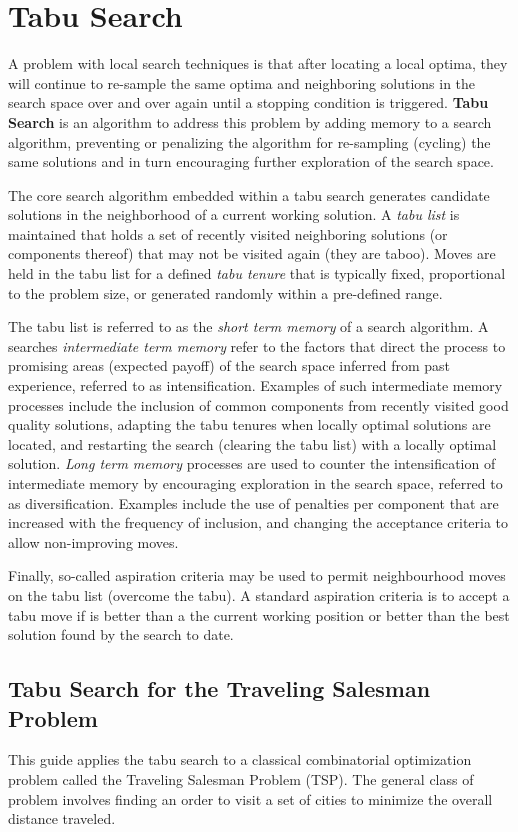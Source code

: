 \section{Tabu Search}
A problem with local search techniques is that after locating a local optima, they will continue to re-sample the same optima and neighboring solutions in the search space over and over again until a stopping condition is triggered. \textbf{Tabu Search} is an algorithm to address this problem by adding memory to a search algorithm, preventing or penalizing the algorithm for re-sampling (cycling) the same solutions and in turn encouraging further exploration of the search space.

The core search algorithm embedded within a tabu search generates candidate solutions in the neighborhood of a current working solution. A \emph{tabu list} is maintained that holds a set of recently visited neighboring solutions (or components thereof) that may not be visited again (they are taboo). Moves are held in the tabu list for a defined \emph{tabu tenure} that is typically fixed, proportional to the problem size, or generated randomly within a pre-defined range.

The tabu list is referred to as the \emph{short term memory} of a search algorithm. A searches \emph{intermediate term memory} refer to the factors that direct the process to promising areas (expected payoff) of the search space inferred from past experience, referred to as intensification. Examples of such intermediate memory processes include the inclusion of common components from recently visited good quality solutions, adapting the tabu tenures when locally optimal solutions are located, and restarting the search (clearing the tabu list) with a locally optimal solution. \emph{Long term memory} processes are used to counter the intensification of intermediate memory by encouraging exploration in the search space, referred to as diversification. Examples include the use of penalties per component that are increased with the frequency of inclusion, and changing the acceptance criteria to allow non-improving moves.

Finally, so-called aspiration criteria may be used to permit neighbourhood moves on the tabu list (overcome the tabu). A standard aspiration criteria is to accept a tabu move if is better than a the current working position or better than the best solution found by the search to date.

\subsection{Tabu Search for the Traveling Salesman Problem}
This guide applies the tabu search to a classical combinatorial optimization problem called the Traveling Salesman Problem (TSP). The general class of problem involves finding an order to visit a set of cities to minimize the overall distance traveled.

